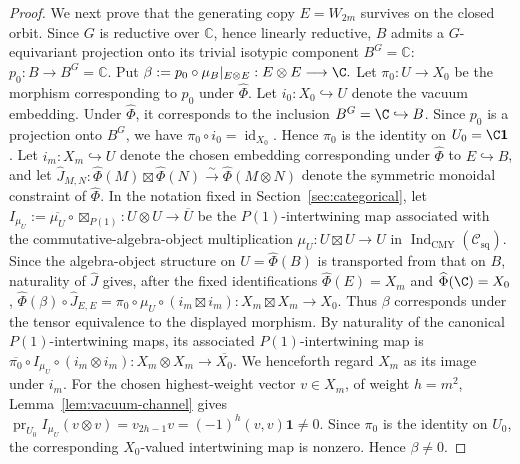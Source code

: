 \documentclass[12pt,leqno]{amsart}
\numberwithin{equation}{section} \newtheorem{thm}{Theorem}[section] \newtheorem{lem}[thm]{Lemma} \newtheorem{ex}[thm]{Example} \newtheorem{prop}[thm]{Proposition} \newtheorem{cor}[thm]{Corollary} \newtheorem{defi}[thm]{Definition} \newtheorem{rmk}[thm]{Remark} \newtheorem{notation}[thm]{Notation}
\newcommand{\one}{\mathbf{1}}
\newcommand{\id}{\operatorname{id}}
\newcommand{\Csq}{\mathcal C_{\mathrm{sq}}}
\newcommand{\IndCMY}{\operatorname{Ind}_{\mathrm{CMY}}}
\begin{document}
\begin{proof}
We next prove that the generating copy $E=W_{2m}$ survives on the closed orbit. Since $G$ is reductive over $\mathbb C$, hence linearly reductive, $B$ admits a $G$-equivariant projection onto its trivial isotypic component $B^G=\mathbb C$: $p_0:B\longrightarrow B^G=\mathbb C.$ Put \(\beta:=p_0\circ\mu_B|_{E\otimes E}:E\otimes E\longrightarrow\C.\) Let $\pi_0:U\to X_0$ be the morphism corresponding to $p_0$ under $\widehat\Phi$. Let $i_0:X_0\hookrightarrow U$ denote the vacuum embedding. Under $\widehat\Phi$, it corresponds to the inclusion $B^G=\C\hookrightarrow B$. Since $p_0$ is a projection onto $B^G$, we have $\pi_0\circ i_0=\id_{X_0}.$ Hence $\pi_0$ is the identity on $U_0=\C\one$. Let $i_m:X_m\hookrightarrow U$ denote the chosen embedding corresponding under $\widehat\Phi$ to $E\hookrightarrow B$, and let \(\widehat J_{M,N}:\widehat\Phi(M)\boxtimes\widehat\Phi(N) \overset\sim\longrightarrow\widehat\Phi(M\otimes N)\) denote the symmetric monoidal constraint of $\widehat\Phi$. In the notation fixed in Section~\ref{sec:categorical}, let \(I_{\mu_U}:=\overline{\mu_U}\circ\boxtimes_{P(1)}:U\otimes U\to\overline U\) be the $P(1)$-intertwining map associated with the commutative-algebra-object multiplication $\mu_U:U\boxtimes U\to U$ in $\IndCMY(\Csq)$. Since the algebra-object structure on $U=\widehat\Phi(B)$ is transported from that on $B$, naturality of $\widehat J$ gives, after the fixed identifications $\widehat\Phi(E)=X_m$ and $\widehat\Phi(\C)=X_0$, \(\widehat\Phi(\beta)\circ\widehat J_{E,E} =\pi_0\circ\mu_U\circ(i_m\boxtimes i_m): X_m\boxtimes X_m\longrightarrow X_0\). Thus $\beta$ corresponds under the tensor equivalence to the displayed morphism. By naturality of the canonical $P(1)$-intertwining maps, its associated $P(1)$-intertwining map is \(\overline{\pi_0}\circ I_{\mu_U}\circ(i_m\otimes i_m): X_m\otimes X_m\longrightarrow\overline{X_0}\). We henceforth regard $X_m$ as its image under $i_m$. For the chosen highest-weight vector $v\in X_m$, of weight $h=m^2$, Lemma~\ref{lem:vacuum-channel} gives \(\operatorname{pr}_{U_0}I_{\mu_U}(v\otimes v)=v_{2h-1}v=(-1)^h(v,v)\one\ne0.\) Since $\pi_0$ is the identity on $U_0$, the corresponding $X_0$-valued intertwining map is nonzero. Hence $\beta\ne0$.


\end{proof}
\end{document}
